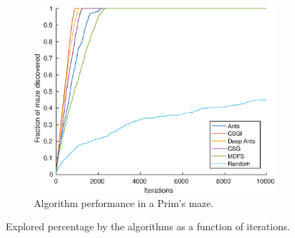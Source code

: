 \documentclass{article}
\begin{document}
\begin{figure}[H]
    \begin{subfigure}[b]{0.45\textwidth}
        \includegraphics[width=\textwidth]{Covered_vs_iterations_for_3_agents_on_50x50_map_Easy=10.eps}
        \caption{ Algorithm performance in a Prim's maze. }
    \end{subfigure}
    
    \caption{Explored percentage by the algorithms as a function of
      iterations.}
    \label{fig:perf_iters}
\end{figure}
\end{document}
